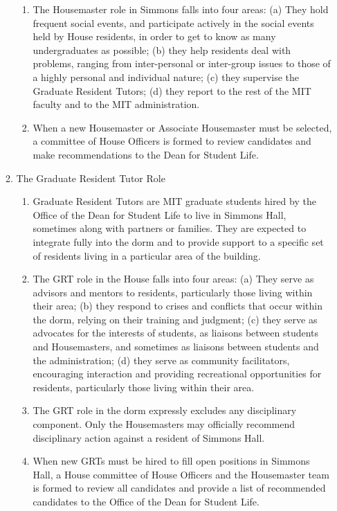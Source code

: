\documentclass[letterpaper]{article}
\begin{document}
\begin{enumerate}
\begin{enumerate}
\begin{enumerate}
\item The Housemaster role in Simmons falls into four areas: (a) They hold frequent social events, and participate actively in the social events held by House residents, in order to get to know as many undergraduates as possible; (b) they help residents deal with problems, ranging from inter-personal or inter-group issues to those of a highly personal and individual nature; (c) they supervise the Graduate Resident Tutors; (d) they report to the rest of the MIT faculty and to the MIT administration.

\item When a new Housemaster or Associate Housemaster must be selected, a committee of House Officers is formed to review candidates and make recommendations to the Dean for Student Life.

\end{enumerate}

\item The Graduate Resident Tutor Role 

\begin{enumerate}

\item Graduate Resident Tutors are MIT graduate students hired by the Office of the Dean for Student Life to live in Simmons Hall, sometimes along with partners or families. They are expected to integrate fully into the dorm and to provide support to a specific set of residents living in a particular area of the building.

\item The GRT role in the House falls into four areas: (a) They serve as advisors and mentors to residents, particularly those living within their area; (b) they respond to crises and conflicts that occur within the dorm, relying on their training and judgment; (c) they serve as advocates for the interests of students, as liaisons between students and Housemasters, and sometimes as liaisons between students and the administration; (d) they serve as community facilitators, encouraging interaction and providing recreational opportunities for residents, particularly those living within their area.

\item The GRT role in the dorm expressly excludes any disciplinary component. Only the Housemasters may officially recommend disciplinary action against a resident of Simmons Hall.

\item When new GRTs must be hired to fill open positions in Simmons Hall, a House committee of House Officers and the Housemaster team is formed to review all candidates and provide a list of recommended candidates to the Office of the Dean for Student Life.


\end{enumerate}
\end{enumerate}
\end{enumerate}
\end{document}
